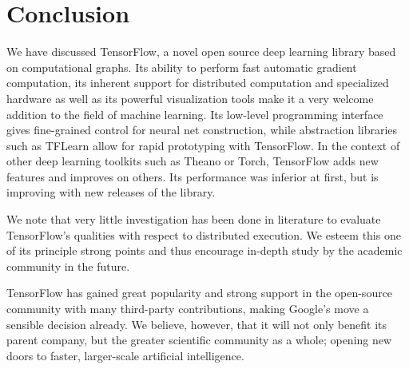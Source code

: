 \section{Conclusion}\label{sec:conclusion}

We have discussed TensorFlow, a novel open source deep learning library based
on computational graphs. Its ability to perform fast automatic gradient
computation, its inherent support for distributed computation and specialized
hardware as well as its powerful visualization tools make it a very welcome
addition to the field of machine learning. Its low-level programming interface
gives fine-grained control for neural net construction, while abstraction
libraries such as TFLearn allow for rapid prototyping with TensorFlow.  In the
context of other deep learning toolkits such as Theano or Torch, TensorFlow adds
new features and improves on others. Its performance was inferior at first, but
is improving with new releases of the library.

We note that very little investigation has been done in literature to evaluate
TensorFlow's qualities with respect to distributed execution. We esteem this one
of its principle strong points and thus encourage in-depth study by the academic
community in the future.

TensorFlow has gained great popularity and strong support in the open-source
community with many third-party contributions, making Google's move a sensible
decision already. We believe, however, that it will not only benefit its parent
company, but the greater scientific community as a whole; opening new doors to
faster, larger-scale artificial intelligence.

